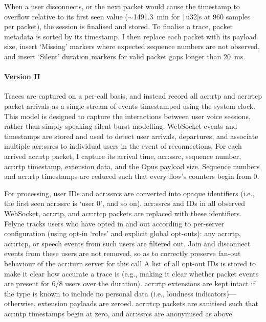 When a user disconnects, or the next packet would cause the timestamp to overflow relative to its first seen value ($\sim$\qty{1491.3}{\minute} for \texttt|u32|s at \num{960} samples per packet), the session is finalised and stored.
To finalise a trace, packet metadata is sorted by its timestamp.
I then replace each packet with its payload size, insert `Missing' markers where expected sequence numbers are not observed, and insert `Silent' duration markers for valid packet gaps longer than \qty{20}{\milli\second}.

\paragraph{Version \RN{2}}
Traces are captured on a per-call basis, and instead record all \gls{acr:rtp} and \gls{acr:rtcp} packet arrivals as a single stream of events timestamped using the system clock.
This model is designed to capture the interactions between user voice sessions, rather than simply speaking-silent burst modelling.
WebSocket events and timestamps are stored and used to detect user arrivals, departures, and associate multiple \glspl{acr:ssrc} to individual users in the event of reconnections.
For each arrived \gls{acr:rtp} packet, I capture its arrival time, \gls{acr:ssrc}, sequence number, \gls{acr:rtp} timestamp, extension data, and the Opus payload size.
Sequence numbers and \gls{acr:rtp} timestamps are reduced such that every flow's counters begin from 0.

For processing, user IDs and \glspl{acr:ssrc} are converted into opaque identifiers (i.e., the first seen \gls{acr:ssrc} is `user 0', and so on).
\glspl{acr:ssrc} and IDs in all observed WebSocket, \gls{acr:rtp}, and \gls{acr:rtcp} packets are replaced with these identifiers.
Felyne tracks users who have opted in and out according to per-server configuration (using opt-in `roles' and explicit global opt-outs): any \gls{acr:rtp}, \gls{acr:rtcp}, or speech events from such users are filtered out.
Join and disconnect events from these users are not removed, so as to correctly preserve fan-out behaviour of the \gls{acr:turn} server for this call
A list of all opt-out IDs is stored to make it clear how accurate a trace is (e.g., making it clear whether packet events are present for 6/8 users over the duration).
\gls{acr:rtp} extensions are kept intact if the type is known to include no personal data (i.e., loudness indicators)---otherwise, extension payloads are zeroed.
\gls{acr:rtcp} packets are sanitised such that \gls{acr:ntp} timestamps begin at zero, and \glspl{acr:ssrc} are anonymised as above.

